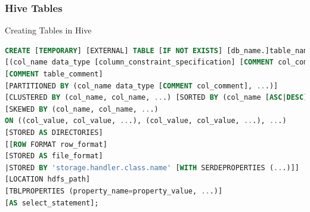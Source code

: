 \subsubsection{Hive Tables}
\begin{frame}[fragile]{Creating Tables in Hive}
\vspace{-.2cm}
\begin{lstlisting}[caption={Create Table Commands},language=SQL]
CREATE [TEMPORARY] [EXTERNAL] TABLE [IF NOT EXISTS] [db_name.]table_name
[(col_name data_type [column_constraint_specification] [COMMENT col_comment], ... [constraint_specification])]
[COMMENT table_comment]
[PARTITIONED BY (col_name data_type [COMMENT col_comment], ...)]
[CLUSTERED BY (col_name, col_name, ...) [SORTED BY (col_name [ASC|DESC], ...)] INTO num_buckets BUCKETS]
[SKEWED BY (col_name, col_name, ...)
ON ((col_value, col_value, ...), (col_value, col_value, ...), ...)
[STORED AS DIRECTORIES]
[[ROW FORMAT row_format] 
[STORED AS file_format]
|STORED BY 'storage.handler.class.name' [WITH SERDEPROPERTIES (...)]]
[LOCATION hdfs_path]
[TBLPROPERTIES (property_name=property_value, ...)]
[AS select_statement];
\end{lstlisting}

\end{frame}

